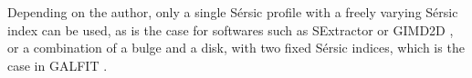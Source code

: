 Depending on the author, only a single Sérsic profile with a freely varying Sérsic index can be used, as is the case for softwares such as SExtractor  or GIMD2D , or a combination of a bulge and a disk, with two fixed Sérsic indices, which is the case in GALFIT . \\